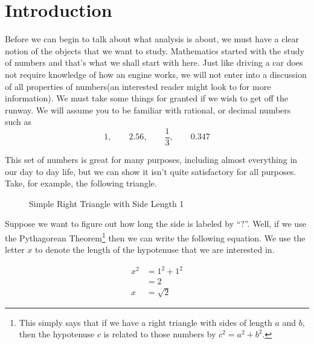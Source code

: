 \documentclass[../../templates/section]{subfiles}
\begin{document}
\section{Introduction}\label{sec:introduction}

Before we can begin to talk about what analysis is about, we must have a clear
notion of the objects that we want to study. Mathematics started with the study
of numbers and that's what we shall start with here. Just like driving a car
does not require knowledge of how an engine works, we will not enter into a
discussion of all properties of numbers(an interested reader might look to
 for more information). We
must take some things for granted if we wish to get off the runway. We will
assume you to be familiar with rational, or decimal numbers such as
\begin{equation}\label{eq:numbers}
1, \qquad 2.56, \qquad \frac{1}{3}, \qquad 0.347
\end{equation}

This set of numbers is great for many purposes, including almost everything in
our day to day life, but we can show it isn't quite satisfactory for all
purposes. Take, for example, the following triangle.

\begin{figure}\label{fig:right-triangle}
    \centering
    \caption{Simple Right Triangle with Side Length 1}
\end{figure}

Suppose we want to figure out how long the side is labeled by ``?''. Well, if
we use the Pythagorean Theorem\footnote{This simply says that if we have a
right triangle with sides of length $a$ and $b$, then the hypotenuse $c$ is
related to those numbers by $c^2 = a^2 + b^2$.} then we can write the following
equation. We use the letter $x$ to denote the length of the hypotenuse that we
are interested in. 

\begin{align}
    x^2 & = 1^2 + 1^2 \nonumber \\ 
    & = 2 \nonumber \\ 
    x & = \sqrt{2} \label{eq:sqrt2}
\end{align}
\end{document}
